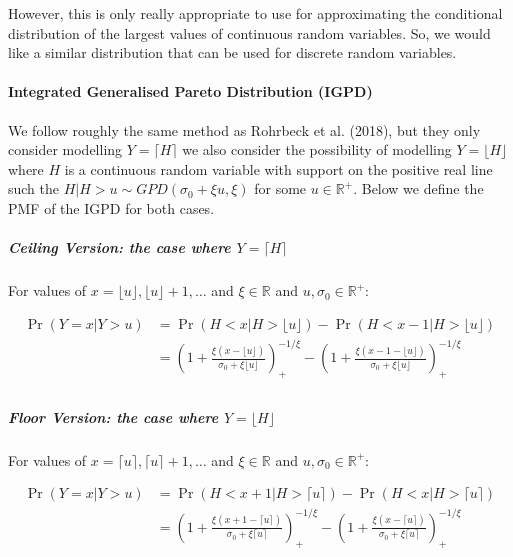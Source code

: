 \documentclass[
]{article}
\let\oldparagraph\paragraph
\renewcommand{\paragraph}[1]{\oldparagraph{#1}\mbox{}}
\let\oldsubparagraph\subparagraph
\renewcommand{\subparagraph}[1]{\oldsubparagraph{#1}\mbox{}}
\begin{document}
However, this is only really appropriate to use for approximating the
conditional distribution of the largest values of continuous random
variables. So, we would like a similar distribution that can be used for
discrete random variables.

\paragraph{Integrated Generalised Pareto Distribution
(IGPD)}\label{integrated-generalised-pareto-distribution-igpd}

We follow roughly the same method as Rohrbeck et al. (2018), but they
only consider modelling \(Y=\lceil H\rceil\) we also consider the
possibility of modelling \(Y=\lfloor H\rfloor\) where \(H\) is a
continuous random variable with support on the positive real line such
the \(H|H>u \sim GPD(\sigma_0 + \xi u, \xi)\) for some
\(u\in \mathbb{R}^+\). Below we define the PMF of the IGPD for both
cases.

\subparagraph{\texorpdfstring{Ceiling Version: the case where
\(Y=\lceil H \rceil\)}{Ceiling Version: the case where Y=\textbackslash lceil H \textbackslash rceil}}\label{ceiling-version-the-case-where-ylceil-h-rceil}

For values of \(x = \lfloor u \rfloor , \lfloor u \rfloor +1, \ldots\)
and \(\xi\in\mathbb{R}\) and \(u,\sigma_0 \in \mathbb{R}^+\):

\begin{align*}
\Pr(Y=x|Y>u) &= \Pr(H<x|H>\lfloor u \rfloor) - \Pr(H<x-1|H>\lfloor u \rfloor)\\ 
             &= \left(1+\frac{\xi(x-\lfloor u \rfloor)}{\sigma_0 + \xi \lfloor u \rfloor}\right)_+^{-1/\xi} - \left(1+\frac{\xi(x-1-\lfloor u \rfloor)}{\sigma_0 + \xi \lfloor u \rfloor}\right)_+^{-1/\xi}\\
%
\end{align*}

\subparagraph{\texorpdfstring{Floor Version: the case where
\(Y=\lfloor H \rfloor\)}{Floor Version: the case where Y=\textbackslash lfloor H \textbackslash rfloor}}\label{floor-version-the-case-where-ylfloor-h-rfloor}

For values of \(x = \lceil u \rceil , \lceil u \rceil +1, \ldots\) and
\(\xi\in\mathbb{R}\) and \(u,\sigma_0 \in \mathbb{R}^+\):

\begin{align*}
\Pr(Y=x|Y>u) &= \Pr(H<x+1|H>\lceil u \rceil) - \Pr(H<x|H>\lceil u \rceil)\\ 
             &= \left(1+\frac{\xi(x+1-\lceil u \rceil)}{\sigma_0 + \xi \lceil u \rceil}\right)_+^{-1/\xi} - \left(1+\frac{\xi(x-\lceil u \rceil)}{\sigma_0 + \xi \lceil u \rceil}\right)_+^{-1/\xi}\\
%
\end{align*}
\end{document}
